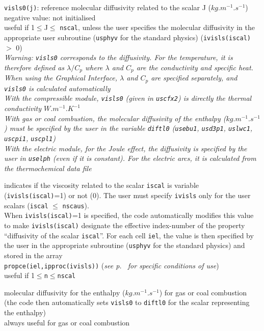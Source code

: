 {{\tt visls0(j)}: reference molecular diffusivity related to the scalar J
($kg.m^{-1}.s^{-1}$)\\
negative value: not initialised\\
useful if 1$\leqslant$J$\leqslant$ {\tt nscal}, unless the user specifies the
molecular diffusivity in the appropriate user subroutine (\texttt{usphyv} for
the standard physics) ({\tt ivisls(iscal)} $>$ 0)\\
{\em Warning: {\tt visls0} corresponds to the diffusivity. For the temperature, it is
therefore defined as $\lambda/C_p$ where $\lambda$ and $C_p$ are the
conductivity and specific heat. When using the Graphical Interface, $\lambda$ and
$C_p$ are specified separately, and {\tt visls0} is calculated automatically\\
With the compressible module, {\tt visls0} (given in \texttt{uscfx2}) is directly the
thermal conductivity $W.m^{-1}.K^{-1}$\\
With gas or coal combustion, the molecular diffusivity of the enthalpy
($kg.m^{-1}.s^{-1}$) must be specified by the user in the variable {\tt diftl0}
(\texttt{usebu1}, \texttt{usd3p1}, \texttt{uslwc1}, \texttt{uscpi1}, \texttt{uscpl1})\\
With the electric module, for the Joule effect, the diffusivity is specified by
the user in \texttt{uselph} (even if it is constant). For the electric arcs, it
is calculated from the thermochemical data file}}

{indicates if the viscosity related to the scalar {\tt iscal} is variable
({\tt ivisls(iscal)}=1) or not (0). The user must specify {\tt ivisls} only for the
user scalars ({\tt iscal} $\leqslant$ {\tt nscaus}).\\
When {\tt ivisls(iscal)}=1 is specified, the code automatically modifies this value to
make {\tt ivisls(iscal)} designate the effective index-number of the property
``diffusivity of the scalar {\tt iscal}''. For each cell {\tt iel}, the value
is then specified by the user in the appropriate subroutine
(\texttt{usphyv} for the standard physics) and stored in the array\\
{\tt propce(iel,ipproc(ivisls))}
({\em see p.~\pageref{sec:prg_propvar} for specific conditions of use})\\
useful if 1$\leqslant${\tt n}$\leqslant${\tt nscal}}


{molecular diffusivity for the enthalpy ($kg.m^{-1}.s^{-1}$) for gas or coal
combustion (the code then automatically sets {\tt visls0} to {\tt diftl0} for the scalar
representing the enthalpy)\\
always useful for gas or coal combustion}


